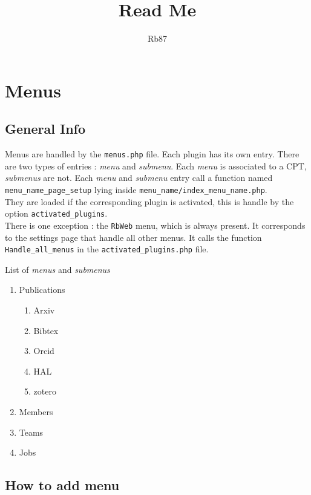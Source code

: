 \documentclass[11pt]{article}
\author{Rb87}
\title{Read Me }
\date{}
\begin{document}
\maketitle
\tableofcontents

\section{Menus}
\subsection{General Info}
Menus are handled by the \texttt{menus.php} file. Each plugin has its own entry. There are two types of entries : \emph{menu} and \emph{submenu}. Each \emph{menu} is associated to a CPT, \emph{submenus} are not. Each \emph{menu} and \emph{submenu} entry call a function named \texttt{menu\_name\_page\_setup} lying inside \texttt{menu\_name/index\_menu\_name.php}.\\
\noindent
They are loaded if the corresponding plugin is activated, this is handle by the option \texttt{activated\_plugins}. \\

There is one exception : the \texttt{RbWeb} menu, which is always present. It corresponds to the settings page that handle all other menus. It calls the function \texttt{Handle\_all\_menus} in the \texttt{activated\_plugins.php} file. 



List of \emph{menus} and \emph{submenus}
\begin{enumerate}
\item Publications
\begin{enumerate}
\item Arxiv
\item Bibtex
\item Orcid
\item HAL
\item zotero
\end{enumerate}
\item Members
\item Teams
\item Jobs
\end{enumerate}

\subsection{How to add menu}
\end{document}
